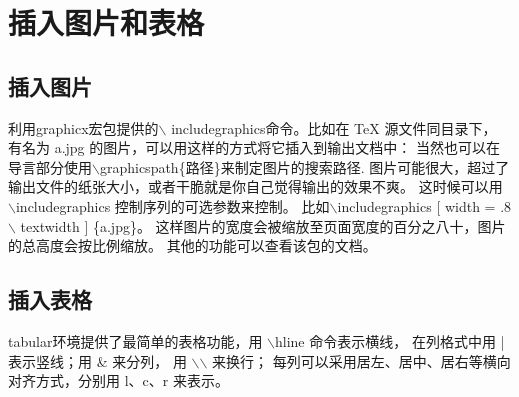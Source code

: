 \section{插入图片和表格}
\subsection{插入图片}
利用graphicx宏包提供的$\backslash$ includegraphics命令。比如在 TeX 源文件同目录下，
有名为 a.jpg 的图片，可以用这样的方式将它插入到输出文档中：
当然也可以在导言部分使用$\backslash$gra\-phicspath\{路径\}来制定图片的搜索路径.
图片可能很大，超过了输出文件的纸张大小，或者干脆就是你自己觉得输出的效果不爽。
这时候可以用 $\backslash$includegraphics 控制序列的可选参数来控制。
比如$\backslash$includegraphics [ width = .8$\backslash$ textwidth ] \{a.jpg\}。
这样图片的宽度会被缩放至页面宽度的百分之八十，图片的总高度会按比例缩放。
其他的功能可以查看该包的文档。

\subsection{插入表格}
tabular环境提供了最简单的表格功能，用 $\backslash$hline 命令表示横线，
在列格式中用 | 表示竖线；用 \& 来分列，
用 $\backslash$$\backslash$ 来换行；
每列可以采用居左、居中、居右等横向对齐方式，分别用 l、c、r 来表示。

